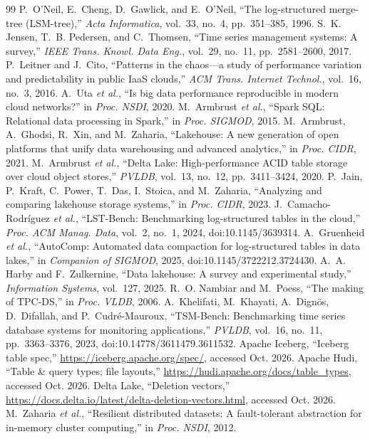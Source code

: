 \documentclass[conference]{IEEEtran}
\begin{document}
\begin{thebibliography}{99}
 P.~O'Neil, E.~Cheng, D.~Gawlick, and E.~O'Neil, ``The log-structured merge-tree (LSM-tree),''
\emph{Acta Informatica}, vol.~33, no.~4, pp.~351--385, 1996.
 S.~K. Jensen, T.~B. Pedersen, and C.~Thomsen, ``Time series management systems: A survey,''
\emph{IEEE Trans. Knowl. Data Eng.}, vol.~29, no.~11, pp.~2581--2600, 2017.
 P.~Leitner and J.~Cito, ``Patterns in the chaos---a study of performance variation and
predictability in public IaaS clouds,'' \emph{ACM Trans. Internet Technol.}, vol.~16, no.~3, 2016.
 A.~Uta \emph{et al.}, ``Is big data performance reproducible in modern cloud
networks?'' in \emph{Proc. NSDI}, 2020.
 M.~Armbrust \emph{et al.}, ``Spark SQL: Relational data processing in Spark,'' in
\emph{Proc. SIGMOD}, 2015.
 M.~Armbrust, A.~Ghodsi, R.~Xin, and M.~Zaharia, ``Lakehouse: A new generation of open
platforms that unify data warehousing and advanced analytics,'' in \emph{Proc. CIDR}, 2021.
 M.~Armbrust \emph{et al.}, ``Delta Lake: High-performance ACID table storage over cloud
object stores,'' \emph{PVLDB}, vol.~13, no.~12, pp.~3411--3424, 2020.
 P.~Jain, P.~Kraft, C.~Power, T.~Das, I.~Stoica, and M.~Zaharia, ``Analyzing and comparing
lakehouse storage systems,'' in \emph{Proc. CIDR}, 2023.
 J.~Camacho-Rodr\'iguez \emph{et al.}, ``LST-Bench: Benchmarking log-structured tables
in the cloud,'' \emph{Proc. ACM Manag. Data}, vol.~2, no.~1, 2024, doi:10.1145/3639314.
 A.~Gruenheid \emph{et al.}, ``AutoComp: Automated data compaction for log-structured
tables in data lakes,'' in \emph{Companion of SIGMOD}, 2025, doi:10.1145/3722212.3724430.
 A.~A. Harby and F.~Zulkernine, ``Data lakehouse: A survey and experimental study,''
\emph{Information Systems}, vol.~127, 2025.
 R.~O. Nambiar and M.~Poess, ``The making of TPC-DS,'' in \emph{Proc. VLDB}, 2006.
 A.~Khelifati, M.~Khayati, A.~Dign\"os, D.~Difallah, and P.~Cudr\'e-Mauroux,
``TSM-Bench: Benchmarking time series database systems for monitoring applications,'' \emph{PVLDB}, vol.~16, no.~11,
pp.~3363--3376, 2023, doi:10.14778/3611479.3611532.
 Apache Iceberg, ``Iceberg table spec,'' \url{https://iceberg.apache.org/spec/}, accessed Oct. 2026.
 Apache Hudi, ``Table \& query types; file layouts,'' \url{https://hudi.apache.org/docs/table_types}, accessed Oct. 2026.
 Delta Lake, ``Deletion vectors,'' \url{https://docs.delta.io/latest/delta-deletion-vectors.html}, accessed Oct. 2026.
 M.~Zaharia \emph{et al.}, ``Resilient distributed datasets: A fault-tolerant abstraction for
in-memory cluster computing,'' in \emph{Proc. NSDI}, 2012.
\end{thebibliography}
\end{document}
